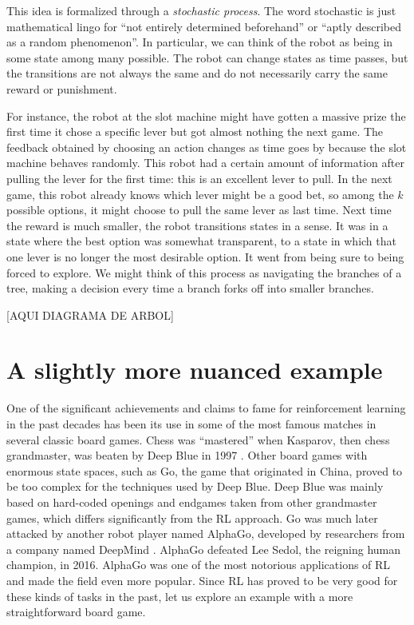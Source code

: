 This idea is formalized through a \textit{stochastic process}. The word
stochastic is just mathematical lingo for ``not entirely determined beforehand''
or ``aptly described as a random phenomenon''. In particular, we can think of
the robot as being in some state among many possible. The robot can change
states as time passes, but the transitions are not always the same and do not
necessarily carry the same reward or punishment.

For instance, the robot at the slot machine might have gotten a massive prize
the first time it chose a specific lever but got almost nothing the next game.
The feedback obtained by choosing an action changes as time goes by because the
slot machine behaves randomly. This robot had a certain amount of information
after pulling the lever for the first time: this is an excellent lever to pull.
In the next game, this robot already knows which lever might be a good bet, so
among the $k$ possible options, it might choose to pull the same lever as last
time. Next time the reward is much smaller, the robot transitions states in a
sense. It was in a state where the best option was somewhat transparent, to a
state in which that one lever is no longer the most desirable option. It went
from being sure to being forced to explore. We might think of this process as
navigating the branches of a tree, making a decision every time a branch forks
off into smaller branches.

[AQUI DIAGRAMA DE ARBOL]

\section{A slightly more nuanced example}
One of the significant achievements and claims to fame for reinforcement
learning in the past decades has been its use in some of the most famous matches
in several classic board games. Chess was ``mastered'' when Kasparov, then chess
grandmaster, was beaten by Deep Blue in 1997 \cite{silver2018chess}. Other board
games with enormous state spaces, such as Go, the game that originated in China,
proved to be too complex for the techniques used by Deep Blue. Deep Blue was
mainly based on hard-coded openings and endgames taken from other grandmaster
games, which differs significantly from the RL approach. Go was much later
attacked by another robot player named AlphaGo, developed by researchers from a
company named DeepMind \cite{silver2017mastering}. AlphaGo defeated Lee Sedol,
the reigning human champion, in 2016. AlphaGo was one of the most notorious
applications of RL and made the field even more popular. Since RL has proved to
be very good for these kinds of tasks in the past, let us explore an example
with a more straightforward board game.

